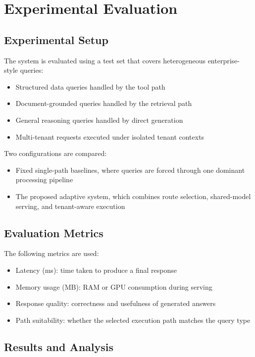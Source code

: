 \section{Experimental Evaluation}

\subsection{Experimental Setup}

The system is evaluated using a test set that covers heterogeneous enterprise-style queries:
\begin{itemize}
    \item Structured data queries handled by the tool path
    \item Document-grounded queries handled by the retrieval path
    \item General reasoning queries handled by direct generation
    \item Multi-tenant requests executed under isolated tenant contexts
\end{itemize}

Two configurations are compared:
\begin{itemize}
    \item Fixed single-path baselines, where queries are forced through one dominant processing pipeline
    \item The proposed adaptive system, which combines route selection, shared-model serving, and tenant-aware execution
\end{itemize}

\subsection{Evaluation Metrics}

The following metrics are used:
\begin{itemize}
    \item Latency (ms): time taken to produce a final response
    \item Memory usage (MB): RAM or GPU consumption during serving
    \item Response quality: correctness and usefulness of generated answers
    \item Path suitability: whether the selected execution path matches the query type
\end{itemize}

\subsection{Results and Analysis}


